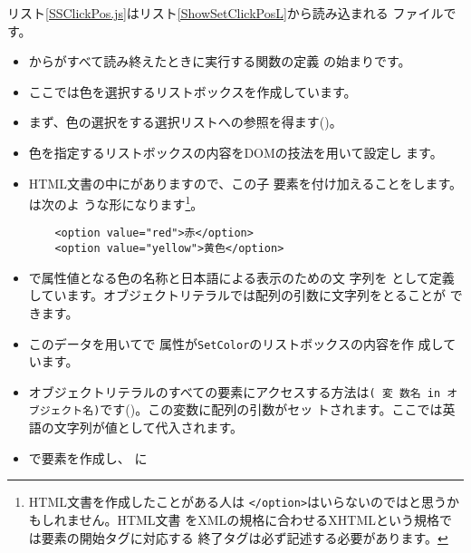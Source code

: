 リスト\ref{SSClickPos.js}はリスト\ref{ShowSetClickPosL}から読み込まれる
\JS ファイルです。
\begin{itemize}
 \item {}から\HTML がすべて読み終えたときに実行する関数の定義
       の始まりです。
  \item ここでは色を選択するリストボックスを作成しています。
 \item まず、色の選択をする選択リストへの参照を得ます()。
  \item 色を指定するリストボックスの内容をDOMの技法を用いて設定し
       ます。
 \item HTML文書の中にがありますので、この子
       要素を付け加えることをします。は次のよ
       うな形になります\footnote{HTML文書を作成したことがある人は
       \texttt{</option>}はいらないのではと思うかもしれません。HTML文書
       をXMLの規格に合わせるXHTMLという規格では要素の開始タグに対応する
       終了タグは必ず記述する必要があります。}。
\begin{Verbatim}
	<option value="red">赤</option>
	<option value="yellow">黄色</option>
\end{Verbatim}
 \item {}で属性値となる色の名称と日本語による表示のための文
       字列を
       として定義しています。オブジェクトリテラルでは配列の引数に文字列をとることが
       できます。
\iffalse
       左側にある文字列は\keysub{キー}{オブジェクトリテラル}{の}と呼
       ばれます。\texttt{:}をはさんだ右側はこのキーにおける値であり、こ
       こには任意の\JS のオブジェクトを記述できます。値は「オブジェクト
       名[キー]」の
       形で取り扱うことができます(\Line{createTextNode}参照)。
\fi
 \item このデータを用いてで
       属性が\texttt{SetColor}のリストボックスの内容を作
       成しています。
 \item オブジェクトリテラルのすべての要素にアクセスする方法は\texttt{( 変
       数名 in オブジェクト名)}です()。この変数に配列の引数がセッ
       トされます。ここでは英語の文字列が値として代入されます。
 \item {}で要素を作成し、
       に

\end{itemize}
